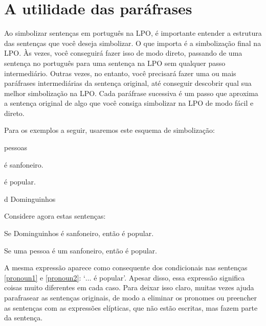 

\section{A utilidade das paráfrases}
Ao simbolizar sentenças em português na LPO, é importante entender a estrutura das sentenças que você deseja simbolizar.
O que importa é a simbolização final na LPO.
Às vezes, você conseguirá fazer isso de modo direto, passando de uma sentença no português para uma sentença na LPO sem qualquer passo intermediário.
Outras vezes, no entanto, você precisará fazer uma ou mais paráfrases intermediárias da sentença original, até conseguir descobrir qual sua melhor simbolização na LPO.
Cada paráfrase sucessiva é um passo que aproxima a sentença original de algo que você consiga simbolizar na LPO de modo fácil e direto.

Para os exemplos a seguir, usaremos este esquema de simbolização:
	\begin{center}
	\begin{ekey}
		\item[\text{domínio}] pessoas
		\item[\atom{S}{x}]  é sanfoneiro.
		\item[\atom{P}{x}]  é popular.
		\item[d] Dominguinhos
	\end{ekey}
	\end{center}
Considere agora estas sentenças:
	\begin{earg}
		\item[\ex{pronoun1}] Se Dominguinhos é sanfoneiro, então é popular.
		\item[\ex{pronoun2}] Se uma pessoa é um sanfoneiro, então é popular.
	\end{earg}
A mesma expressão aparece como consequente dos condicionais nas sentenças \ref{pronoun1} e \ref{pronoun2}: `$\ldots$ é popular'.
Apesar disso, essa expressão significa coisas muito diferentes em cada caso.
Para deixar isso claro, muitas vezes ajuda parafrasear as sentenças originais, de modo a eliminar os pronomes ou preencher as sentenças com as expressões elípticas, que não estão escritas, mas fazem parte da sentença.

